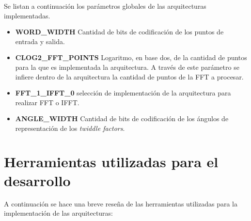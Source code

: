 Se listan a continuación los parámetros globales de las arquitecturas implementadas.

\begin{itemize}
  \item \textbf{WORD\_WIDTH} Cantidad de bits de codificación de los puntos de entrada y salida.
  \item \textbf{CLOG2\_FFT\_POINTS} Logaritmo, en base dos, de la cantidad de puntos para la que es
  implementada la arquitectura. A través de este parámetro se infiere dentro de la arquitectura la
  cantidad de puntos de la FFT a procesar.
  \item \textbf{FFT\_1\_IFFT\_0} selección de implementación de la arquitectura para realizar FFT o
  IFFT.
  \item \textbf{ANGLE\_WIDTH} Cantidad de bits de codificación de los ángulos de representación de
  los \textit{twiddle factors}.
\end{itemize}

\section{Herramientas utilizadas para el desarrollo} \label{sec:herrSec}
% 
% 
% 
% 
 A continuación se hace una breve reseña de las herramientas utilizadas para la implementación de
 las arquitecturas:
 
